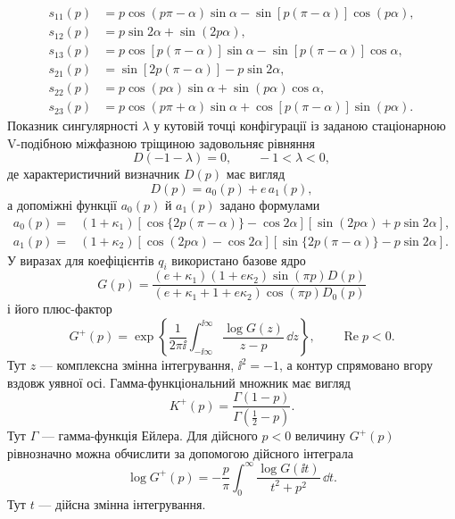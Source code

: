 \begin{equation*}
\begin{aligned}
  s_{11}(p)&=p\cos(p\pi-\alpha)\sin\alpha
             -\sin[p(\pi-\alpha)]\cos(p\alpha),\\
  s_{12}(p)&=p\sin2\alpha+\sin(2p\alpha),\\
  s_{13}(p)&=p\cos[p(\pi-\alpha)]\sin\alpha
             -\sin[p(\pi-\alpha)]\cos\alpha,\\
  s_{21}(p)&=\sin[2p(\pi-\alpha)]-p\sin2\alpha,\\
  s_{22}(p)&=p\cos(p\alpha)\sin\alpha
             +\sin(p\alpha)\cos\alpha,\\
  s_{23}(p)&=p\cos(p\pi+\alpha)\sin\alpha
             +\cos[p(\pi-\alpha)]\sin(p\alpha).
\end{aligned}
\end{equation*}
Показник сингулярності $\lambda$ у кутовій точці конфігурації із заданою стаціонарною V-подібною міжфазною тріщиною задовольняє рівняння
\begin{equation}
\label{eq:app-D-root}
  D(-1-\lambda)=0,
  \qquad -1<\lambda<0,
\end{equation}
де характеристичний визначник $D(p)$ має вигляд
\begin{equation*}
  D(p)=a_0(p)+e\,a_1(p),
\end{equation*}
а допоміжні функції $a_0(p)$ й $a_1(p)$ задано формулами
\begin{equation*}
\begin{aligned}
  a_0(p)={}&(1+\kappa_1)
  [\cos\{2p(\pi-\alpha)\}-\cos2\alpha]
  [\sin(2p\alpha)+p\sin2\alpha],\\
  a_1(p)={}&(1+\kappa_2)
  [\cos(2p\alpha)-\cos2\alpha]
  [\sin\{2p(\pi-\alpha)\}-p\sin2\alpha].
\end{aligned}
\end{equation*}
У виразах для коефіцієнтів $q_i$ використано базове ядро
\begin{equation*}
  G(p)=
  \frac{(e+\kappa_1)(1+e\kappa_2)\sin(\pi p)D(p)}
  {(e+\kappa_1+1+e\kappa_2)\cos(\pi p)D_0(p)}
\end{equation*}
і його плюс-фактор
\begin{equation*}
  G^+(p)=
  \exp\!\left\{
    \frac{1}{2\pi\ii}
    \int_{-\ii\infty}^{\ii\infty}
    \frac{\log G(z)}{z-p}\,\dd z
  \right\},
  \qquad \operatorname{Re}p<0.
\end{equation*}
Тут $z$ — комплексна змінна інтегрування, $\ii^2=-1$, а контур спрямовано вгору вздовж уявної осі. Гамма-функціональний множник має вигляд
\begin{equation*}
  K^+(p)=\frac{\Gamma(1-p)}{\Gamma(\tfrac12-p)}.
\end{equation*}
Тут $\Gamma$ — гамма-функція Ейлера. Для дійсного $p<0$ величину $G^+(p)$ рівнозначно можна обчислити за допомогою дійсного інтеграла
\begin{equation*}
  \log G^+(p)
  =-\frac{p}{\pi}\int_0^\infty
    \frac{\log G(\ii t)}{t^2+p^2}\,\dd t.
\end{equation*}
Тут $t$ — дійсна змінна інтегрування.

